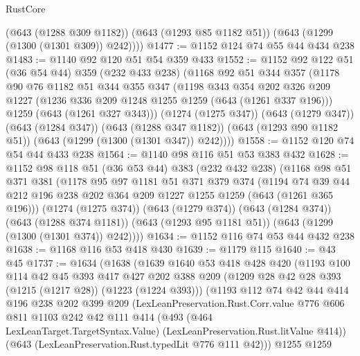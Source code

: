 \begin{lexlean}{RustCore}
\begin{coremodule}
        (@643 (@1288 @309 @1182))
        (@643 (@1293 @85 @1182 @51))
        (@643 (@1299 (@1300 (@1301 @309)) @242))))
@1477 := @1152 @124 @74 @55 @44 @434 @238
@1483 := @1140 @92 @120 @51 @54 @359 @433
@1552 := @1152
    @92
    @122
    @51
    (@36 @54 @44)
    @359
    (@232 @433 @238)
    (@1168
      @92
      @51
      @344
      @357
      (@1178
        @90
        @76
        @1182
        @51
        @344
        @355
        @347
        (@1198
          @343
          @354
          @202
          @326
          @209
          @1227
          (@1236 @336 @209 @1248 @1255 @1259 (@643 (@1261 @337 @196)))
          @1259
          (@643 (@1261 @327 @343)))
        (@1274 (@1275 @347))
        (@643 (@1279 @347))
        (@643 (@1284 @347))
        (@643 (@1288 @347 @1182))
        (@643 (@1293 @90 @1182 @51))
        (@643 (@1299 (@1300 (@1301 @347)) @242))))
@1558 := @1152 @120 @74 @54 @44 @433 @238
@1564 := @1140 @98 @116 @51 @53 @383 @432
@1628 := @1152
    @98
    @118
    @51
    (@36 @53 @44)
    @383
    (@232 @432 @238)
    (@1168
      @98
      @51
      @371
      @381
      (@1178
        @95
        @97
        @1181
        @51
        @371
        @379
        @374
        (@1194 @74 @39 @44 @212 @196 @238 @202 @364 @209 @1227 @1255 @1259 (@643 (@1261 @365 @196)))
        (@1274 (@1275 @374))
        (@643 (@1279 @374))
        (@643 (@1284 @374))
        (@643 (@1288 @374 @1181))
        (@643 (@1293 @95 @1181 @51))
        (@643 (@1299 (@1300 (@1301 @374)) @242))))
@1634 := @1152 @116 @74 @53 @44 @432 @238
@1638 := @1168 @116 @53 @418 @430
@1639 := @1179 @115
@1640 := @43 @45
@1737 := @1634
    (@1638
      (@1639
        @1640
        @53
        @418
        @428
        @420
        (@1193
          @100
          @114
          @42
          @45
          @393
          @417
          @427
          @202
          @388
          @209
          (@1209 @28 @42 @28 @393 (@1215 (@1217 @28)) (@1223 (@1224 @393)))
          (@1193
            @112
            @74
            @42
            @44
            @414
            @196
            @238
            @202
            @399
            @209
            (LexLeanPreservation.Rust.Corr.value
              @776
              @606
              @811
              @1103
              @242
              @42
              @111
              @414
              (@493
                (@464 LexLeanTarget.TargetSyntax.Value)
                (LexLeanPreservation.Rust.litValue @414))
              (@643 (LexLeanPreservation.Rust.typedLit @776 @111 @42)))
            @1255
            @1259

\end{coremodule}
\end{lexlean}
